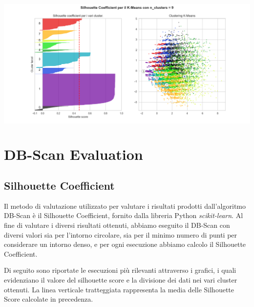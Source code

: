 \documentclass[a4paper, 10pt]{report}
\begin{document}
                \begin{center}
                    \includegraphics[width=14cm]{evaluation/silhouette_9}\\
                \end{center}


        \section{DB-Scan Evaluation}\label{sec:dbscan-evaluation}
            \subsection{Silhouette Coefficient}
                Il metodo di valutazione utilizzato per valutare i risultati prodotti dall'algoritmo DB-Scan è il Silhouette Coefficient,
                fornito dalla libreria Python \textit{scikit-learn}.
                Al fine di valutare i diversi risultati ottenuti, abbiamo eseguito il DB-Scan con diversi valori sia per l'intorno
                circolare, sia per il minimo numero di punti per considerare un intorno denso, e per ogni esecuzione abbiamo calcolo il
                Silhouette Coefficient.

                Di seguito sono riportate le esecuzioni più rilevanti attraverso i grafici, i quali evidenziano il valore del silhouette score
                e la divisione dei dati nei vari cluster ottenuti. La linea verticale tratteggiata rappresenta la media delle Silhouette Score
                calcolate in precedenza.
\end{document}
